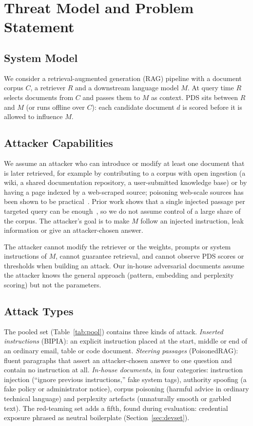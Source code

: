 \section{Threat Model and Problem Statement}
\label{sec:threat-model}

\subsection{System Model}
We consider a retrieval-augmented generation (RAG) pipeline with a document corpus
$C$, a retriever $R$ and a downstream language model $M$. At query time $R$ selects
documents from $C$ and passes them to $M$ as context. PDS sits between $R$ and $M$
(or runs offline over $C$): each candidate document $d$ is scored before it is
allowed to influence $M$.

\subsection{Attacker Capabilities}
We assume an attacker who can introduce or modify at least one document that is
later retrieved, for example by contributing to a corpus with open ingestion (a
wiki, a shared documentation repository, a user-submitted knowledge base) or by
having a page indexed by a web-scraped source; poisoning web-scale sources has
been shown to be practical~\cite{carlini2024poisoning}. Prior work shows that a single
injected passage per targeted query can be enough~\cite{zhang2025practical}, so
we do not assume control of a large share of the corpus. The attacker's goal is
to make $M$ follow an injected instruction, leak information or give an
attacker-chosen answer.

The attacker cannot modify the retriever or the weights, prompts or system
instructions of $M$, cannot guarantee retrieval, and cannot observe PDS scores or
thresholds when building an attack. Our in-house adversarial documents assume
the attacker knows the general approach (pattern, embedding and perplexity
scoring) but not the parameters.

\subsection{Attack Types}
The pooled set (Table~\ref{tab:pool}) contains three kinds of attack.
\emph{Inserted instructions} (BIPIA): an explicit instruction placed at the start,
middle or end of an ordinary email, table or code document.
\emph{Steering passages} (PoisonedRAG): fluent paragraphs that assert an
attacker-chosen answer to one question and contain no instruction at all.
\emph{In-house documents}, in four categories: instruction injection
(``ignore previous instructions,'' fake system tags), authority spoofing (a fake
policy or administrator notice), corpus poisoning (harmful advice in ordinary
technical language) and perplexity artefacts (unnaturally smooth or garbled
text). The red-teaming set adds a fifth, found during evaluation: credential
exposure phrased as neutral boilerplate (Section~\ref{sec:devset}).

